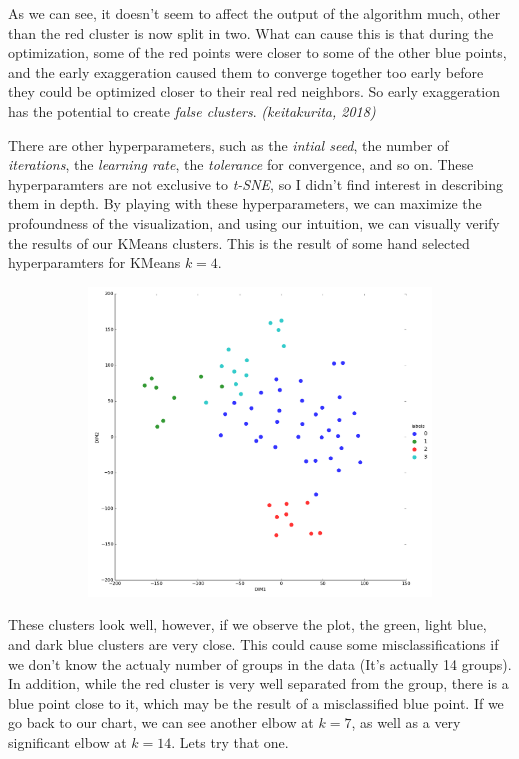 \documentclass[20pt]{article} %
\begin{document}
As we can see, it doesn't seem to affect the output of the algorithm much, other than the red cluster is now split in two.  What can cause this is that during the optimization, some of the red points were closer to some of the other blue points, and the early exaggeration caused them to converge together too early before they could be optimized closer to their real red neighbors.  So early exaggeration has the potential to create \textit{false clusters}. \textit{(keitakurita, 2018)}
\newpage

There are other hyperparameters, such as the \textit{intial seed}, the number of \textit{iterations}, the \textit{learning rate}, the \textit{tolerance} for convergence, and so on.  These hyperparamters are not exclusive to \textit{t-SNE}, so I didn't find interest in describing them in depth. By playing with these hyperparameters, we can maximize the profoundness of the visualization, and using our intuition, we can visually verify the results of our KMeans clusters.  This is the result of some hand selected hyperparamters for KMeans $k=4$.
\begin{figure}[!htbp]
  	\centering
   	\begin{subfigure}[p]{0.7\linewidth}
    	\includegraphics[width=\linewidth]{./figures/plot4.png}
   	\end{subfigure}
\end{figure}
These clusters look well, however, if we observe the plot, the green, light blue, and dark blue clusters are very close.  This could cause some misclassifications if we don't know the actualy number of groups in the data (It's actually 14 groups).  In addition, while the red cluster is very well separated from the group, there is a blue point close to it, which may be the result of a misclassified blue point.  If we go back to our chart, we can see another elbow at $k = 7$, as well as a very significant elbow at $k = 14$.  Lets try that one.
\end{document}

